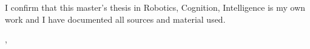 \thispagestyle{empty}
\vspace*{0.8\textheight}
\noindent
I confirm that this master's thesis in Robotics, Cognition, Intelligence is my own work and I have documented all sources and material used.

\vspace{15mm}
\noindent
\getSubmissionLocation{}, \getSubmissionDate{} \hspace{50mm} \getAuthor{}

\cleardoublepage{}
